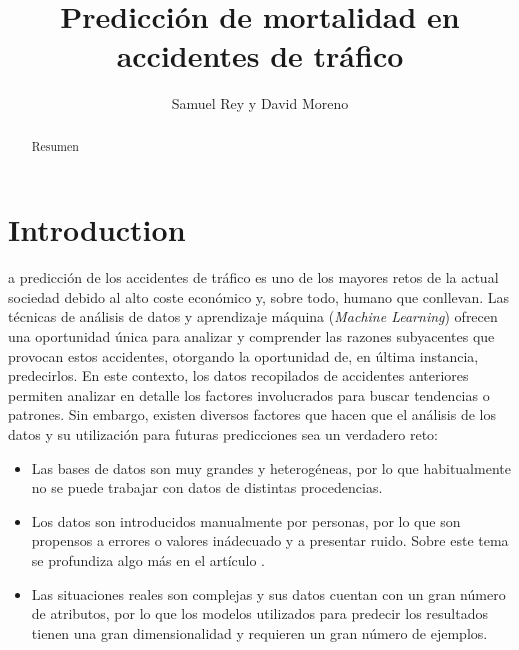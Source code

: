 \documentclass[journal,twoside]{JoPhA}
\begin{document}
\title{Predicción de mortalidad en accidentes de tráfico}
 
\author{Samuel Rey y David Moreno
}


\maketitle


\begin{abstract}
	
Resumen
\end{abstract}


\section{Introduction}
a predicción de los accidentes de tráfico es uno de los mayores retos de la actual sociedad debido al alto coste económico y, sobre todo, humano que conllevan. Las técnicas de análisis de datos y aprendizaje máquina (\textit{Machine Learning}) ofrecen una oportunidad única para analizar y comprender las razones subyacentes que provocan estos accidentes, otorgando la oportunidad de, en última instancia, predecirlos. En este contexto, los datos recopilados de accidentes anteriores permiten analizar en detalle los factores involucrados para buscar tendencias o patrones. Sin embargo, existen diversos factores que hacen que el análisis de los datos y su utilización para futuras predicciones sea un verdadero reto: \\

\begin{itemize}
	\item Las bases de datos son muy grandes y heterogéneas, por lo que habitualmente no se puede trabajar con datos de distintas procedencias. \\
	
	\item Los datos son introducidos manualmente por personas, por lo que son propensos a errores o valores inádecuado y a presentar ruido. Sobre este tema se profundiza algo más en el artículo \cite{analisis_datos}. \\

	\item Las situaciones reales son complejas y sus datos cuentan con un gran número de atributos, por lo que los modelos utilizados para predecir los resultados tienen una gran dimensionalidad y requieren un gran número de ejemplos. \\
\end{itemize}
\end{document}
